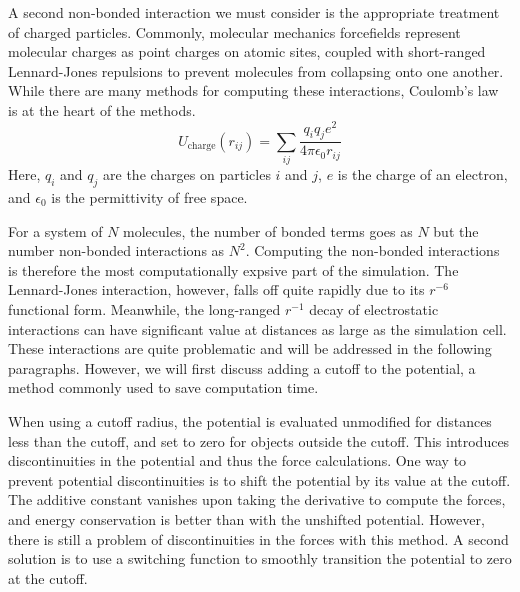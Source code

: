 A second non-bonded interaction we must consider is the appropriate
treatment of charged particles. Commonly, molecular mechanics
forcefields represent molecular charges as point charges on atomic
sites, coupled with short-ranged Lennard-Jones repulsions to prevent
molecules from collapsing onto one another. While there are many
methods for computing these interactions, Coulomb's law is
at the heart of the methods.
\begin{equation}\label{eq:coulomb}
U_{\mathrm{charge}}(r_{ij}) = \sum_{ij}\frac{q_i q_j e^2}{4 \pi \epsilon_0
  r_{ij}}
\end{equation}
Here, $q_i$ and $q_j$ are the charges on particles $i$ and $j$, $e$ is
the charge of an electron, and $\epsilon_0$ is the permittivity of
free space. 

For a system of $N$ molecules, the number of bonded terms goes as $N$
but the number non-bonded interactions as $N^2$.  Computing the
non-bonded interactions is therefore the most computationally expsive
part of the simulation. The Lennard-Jones interaction, however, falls
off quite rapidly due to its $r^{-6}$ functional form. Meanwhile, the
long-ranged $r^{-1}$ decay of electrostatic interactions can have
significant value at distances as large as the simulation cell. These
interactions are quite problematic and will be addressed in the
following paragraphs. However, we will first discuss adding a cutoff
to the potential, a method commonly used to save computation time.


When using a cutoff radius, the potential is evaluated unmodified for
distances less than the cutoff, and set to zero for objects outside
the cutoff. This introduces discontinuities in the potential and thus
the force calculations. One way to prevent potential discontinuities
is to shift the potential by its value at the cutoff.  The additive
constant vanishes upon taking the derivative to compute the forces,
and energy conservation is better than with the unshifted
potential. However, there is still a problem of  discontinuities in the
forces with this method. A second solution is to use a switching
function to smoothly transition the potential to zero at the cutoff.

